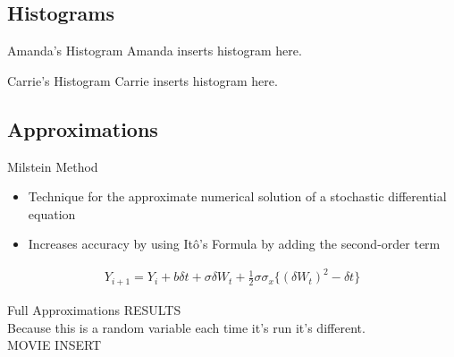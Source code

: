 
\subsection{Histograms}

\begin{frame}{Amanda's Histogram}
Amanda inserts histogram here. 
\end{frame}

\begin{frame}{Carrie's Histogram}
Carrie inserts histogram here. 
\end{frame}



\subsection{Approximations}

\begin{frame}{Milstein Method}
	\begin{itemize}
		\item Technique for the approximate numerical solution of a stochastic differential equation
		\item Increases accuracy by using It\^o's Formula by adding the second-order term
	\end{itemize} 

	\begin{align*}
		Y_{i+1} = Y_i +b\delta t + \sigma \delta W_t + \frac{1}{2} \sigma \sigma_x \{(\delta W_t)^2 - \delta t\} 
	\end{align*}

\end{frame}

\begin{frame}{Full Approximations}
RESULTS \\
Because this is a random variable each time it's run it's different. \\
MOVIE INSERT 
\end{frame}

